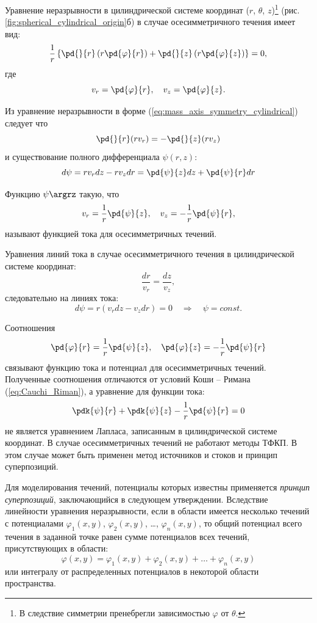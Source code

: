 \documentclass[14pt]{extarticle}
\begin{document}
Уравнение неразрывности в цилиндрической системе координат ($r$, $\theta$, $z$)\footnote{В следствие симметрии пренебрегли зависимостью $\varphi$ от $\theta$.} (рис. \ref{fig:spherical_cylindrical_origin}б) в случае осесимметричного течения имеет вид:
\begin{equation}
\label{eq:mass_axis_symmetry_cylindrical}
\frac{1}{r}
\left\{
\pd{}{r}\left( r \pd{\varphi}{r} \right) + 
\pd{}{z}\left( r \pd{\varphi}{z} \right)
\right\}
= 0,
\end{equation}
где
\[
v_r = \pd{\varphi}{r},\quad
v_z =  \pd{\varphi}{z}.
\]

Из уравнение неразрывности в форме (\ref{eq:mass_axis_symmetry_cylindrical}) следует что
\[
	\pd{}{r}(r v_r)  = -\pd{}{z}(r v_z)
\]	
и существование полного дифференциала $\psi(r,z)$:
\[
	d\psi = r v_r dz - r v_z dr = \pd{\psi}{z} dz + \pd{\psi}{r} dr
\]


\begin{dfn}
Функцию $\psi\argrz$  такую, что
\[
	v_r = \displaystyle\frac{1}{r}\pd{\psi}{z},\quad
	v_z = -\displaystyle\frac{1}{r}\pd{\psi}{r},
\]
называют \alert{функцией тока для осесимметричных течений}.	
\end{dfn}

Уравнения линий тока в случае осесимметричного течения в цилиндрической системе координат:
\[
\frac{dr}{v_r} = \frac{dz}{v_z},
\]
следовательно на линиях тока:
\[
d\psi = r (v_r dz - v_z dr) = 0\quad
\Rightarrow\quad
\psi = const.
\]

Соотношения
\begin{equation}
	\label{eq:phi_psi_connection_sym}
	\pd{\varphi}{r} = \frac{1}{r}\pd{\psi}{z},\quad
	\pd{\varphi}{z} = -\frac{1}{r}\pd{\psi}{r}
\end{equation}
связывают функцию тока и потенциал для осесимметричных течений. Полученные соотношения \alert{отличаются} от условий Коши -- Римана (\ref{eq:Cauchi_Riman}), а уравнение для функции тока:
\[
	\pdk{\psi}{r}+\pdk{\psi}{z} - \frac{1}{r}\pd{\psi}{r} = 0
\]
не является уравнением Лапласа, записанным в цилиндрической системе координат. 
В случае осесимметричных течений не работают методы ТФКП. В этом случае может быть применен \alert{метод источников и стоков} и \alert{принцип суперпозиций}. 
		
Для моделирования течений, потенциалы которых известны применяется \textit{принцип суперпозиций}, заключающийся в следующем утверждении. Вследствие линейности уравнения неразрывности, если в области имеется несколько течений с потенциалами $\varphi_1(x,y)$, $\varphi_2(x,y)$, \ldots, $\varphi_n(x,y)$, то общий потенциал всего течения в заданной точке равен сумме потенциалов всех течений, присутствующих в области:
\[
\varphi(x,y) = \varphi_1(x,y) + \varphi_2(x,y) + \ldots + \varphi_n(x,y)
\] 		
или интегралу от распределенных потенциалов в некоторой области пространства.
\end{document}
